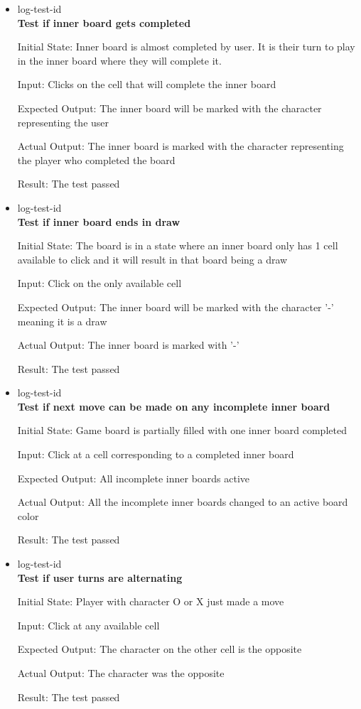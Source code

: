 \documentclass[12pt, titlepage]{article}
\newcounter{LOGnum}
\newcommand{\ttheLOGnum}{log-test-id \theLOGnum}
\begin{document}
\begin{itemize}

\item {\ttheLOGnum \label{LOGtest1}\\}
\textbf{Test if inner board gets completed}
					
Initial State: Inner board is almost completed by user. It is their turn to
play in the inner board where they will complete it.
					
Input: Clicks on the cell that will complete the inner board
					
Expected Output: The inner board will be marked with the character representing the
user

Actual Output: The inner board is marked with the character representing the player 
who completed the board

Result: The test passed

\item {\ttheLOGnum \label{LOGtest2}\\}
\textbf{Test if inner board ends in draw}
					
Initial State: The board is in a state where an inner board only has 1 cell
available to click and it will result in that board being a draw

Input: Click on the only available cell
					
Expected Output: The inner board will be marked with the character '-' meaning it is a
draw

Actual Output: The inner board is marked with '-'

Result: The test passed

\item {\ttheLOGnum \label{LOGtest3}\\}
\textbf{Test if next move can be made on any incomplete inner board}
					
Initial State: Game board is partially filled with one inner board completed

Input: Click at a cell corresponding to a completed inner board
					
Expected Output: All incomplete inner boards active

Actual Output: All the incomplete inner boards changed to an active board color

Result: The test passed

\item {\ttheLOGnum \label{LOGtest4}\\}
\textbf{Test if user turns are alternating}
					
Initial State: Player with character O or X just made a move

Input: Click at any available cell
					
Expected Output: The character on the other cell is the opposite

Actual Output: The character was the opposite

Result: The test passed

\end{itemize}
\end{document}
